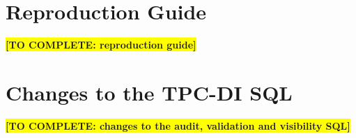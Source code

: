 \documentclass[11pt,a4paper]{article}
\newcommand{\todo}[1]{\colorbox{yellow}{\textbf{[TO COMPLETE: #1]}}}
\begin{document}
\appendix

\section{Reproduction Guide}
\label{app:reproduction}
\todo{reproduction guide}

\section{Changes to the TPC-DI SQL}
\label{app:sql}
\todo{changes to the audit, validation and visibility SQL}
\end{document}
